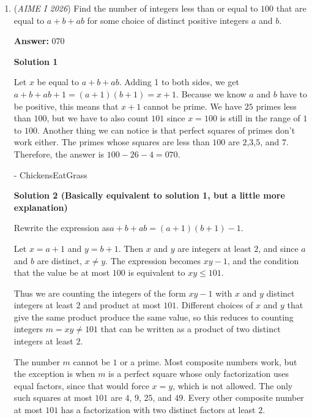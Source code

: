 \begin{enumerate}
 We find the area of this region. We approach like in solution 1, using the Pythagorean Theorem and finding the radius of $\mathcal{T}$ as $20\sqrt{58}$. The area of $\mathcal{T}$ is then $23200 \pi$ and the area of the disk is $40000\pi$ so the ration is $\frac{232}{400} = \frac{29}{50} \implies \boxed{79}$.

 


	\item (\textit{AIME I 2026}) Find the number of integers less than or equal to $100$ that are equal to $a+b+ab$ for some choice of distinct positive integers $a$ and $b$.


 
 \textbf{Answer: }070



\textbf{Solution 1}

Let $x$ be equal to $a+b+ab$. Adding 1 to both sides, we get $a+b+ab+1=(a+1)(b+1)=x+1$. Because we know $a$ and $b$ have to be positive, this means that $x+1$ cannot be prime. We have $25$ primes less than $100$, but we have to also count $101$ since $x=100$ is still in the range of $1$ to $100$. Another thing we can notice is that perfect squares of primes don’t work either. The primes whose squares are less than $100$ are $2$,$3$,$5$, and $7$. Therefore, the answer is $100-26-4=\boxed{070}$.

 - ChickensEatGrass

 



\textbf{Solution 2 (Basically equivalent to solution 1, but a little more explanation)}

Rewrite the expression as$a + b + ab = (a + 1)(b + 1)-1$.

 Let $x = a + 1$ and $y = b + 1$. Then $x$ and $y$ are integers at least $2$, and since $a$ and $b$ are distinct, $x \neq y$. The expression becomes $xy - 1$, and the condition that the value be at most $100$ is equivalent to $xy \leq 101$.

 Thus we are counting the integers of the form $xy-1$ with $x$ and $y$ distinct integers at least $2$ and product at most $101$. Different choices of $x$ and $y$ that give the same product produce the same value, so this reduces to counting integers $m = xy \neq 101$ that can be written as a product of two distinct integers at least $2$.

 The number $m$ cannot be $1$ or a prime. Most composite numbers work, but the exception is when $m$ is a perfect square whose only factorization uses equal factors, since that would force $x = y$, which is not allowed. The only such squares at most $101$ are $4$, $9$, $25$, and $49$. Every other composite number at most $101$ has a factorization with two distinct factors at least $2$.


\end{enumerate}
